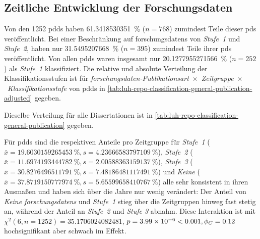 \subsection{Zeitliche Entwicklung der Forschungsdaten}\label{sec:luh-repo-results-time}
Von den \num{1252} \glspl{pdd} haben \SI[round-mode=places,round-precision=2]{61.3418530351}{\percent} ($n=\num{768}$) zumindest Teile dieser \glspl{pd} veröffentlicht.
Bei einer Beschränkung auf \glspl{forschungsdaten} von \textit{Stufe~1} und \textit{Stufe~2}, haben nur \SI[round-mode=places,round-precision=2]{31.5495207668}{\percent} ($n=\num{395}$) zumindest Teile ihrer \glspl{pd} veröffentlicht.
Von allen \glspl{pdd} waren insgesamt nur \SI[round-mode=places,round-precision=2]{20.1277955271566}{\percent} ($n=252$) als \textit{Stufe~1} klassifiziert.
Die relative und absolute Verteilung der Klassifikationsstufen ist für \textit{\gls{forschungsdaten}-Publikationsart}~$\times$~\textit{Zeitgruppe}~$\times$~\textit{Klassifikationsstufe} von \glspl{pdd} in \cref{tab:luh-repo-classification-general-publication-adjusted} gegeben.
\begin{table}[!htbp]
	\caption{\gls{forschungsdaten}-Klassifizierung der \glspl{pdd} aus der Stichprobe nach \textit{Publikationsart}~$\times$~\textit{Klassifikationsstufe}~$\times$~\textit{Jahresgruppe} aufgegliedert.
    Angaben relativ zu der Gesamtanzahl der jeweiligen Zeitgruppe.
    Absolute Werte in Klammern angegeben.}
    
    \label{tab:luh-repo-classification-general-publication-adjusted}
\end{table}
Dieselbe Verteilung für alle Dissertationen ist in \cref{tab:luh-repo-classification-general-publication} gegeben.

Für \glspl{pdd} sind die respektiven Anteile pro Zeitgruppe für \textit{Stufe~1} ($\bar{x}=\SI[round-mode=places,round-precision=2]{19.6030159265453}{\percent},s=\SI[round-mode=places,round-precision=2]{4.23666583797109}{\percent}$), \textit{Stufe~2} ($\bar{x}=\SI[round-mode=places,round-precision=2]{11.6974193444782}{\percent},s=\SI[round-mode=places,round-precision=2]{2.00588363159137}{\percent}$), \textit{Stufe~3} ($\bar{x}=\SI[round-mode=places,round-precision=2]{30.8276496511791}{\percent},s=\SI[round-mode=places,round-precision=2]{7.48186481117491}{\percent}$) und \textit{Keine} ($\bar{x}=\SI[round-mode=places,round-precision=2]{37.8719150777974}{\percent},s=\SI[round-mode=places,round-precision=2]{5.65599658410767}{\percent}$) alle sehr konsistent in ihren Ausmaßen und haben sich über die Jahre nur wenig verändert:
Der Anteil von \textit{Keine \glspl{forschungsdaten}} und \textit{Stufe~1} stieg über die Zeitgruppen hinweg fast stetig an, während der Anteil an \textit{Stufe~2} und \textit{Stufe 3} abnahm.
Diese Interaktion ist mit $\chi^2 (\num{6}, n=\num{1252}) = \num[round-mode=places,round-precision=2]{35.1706024082481}$, $p = \num[round-mode=places,round-precision=2]{3.99360804013405E-06}<\num{0.001},\phi_C=\num[round-mode=places,round-precision=2]{0.118514841833938}$ hochsignifikant aber schwach im Effekt.
\pagebreak

